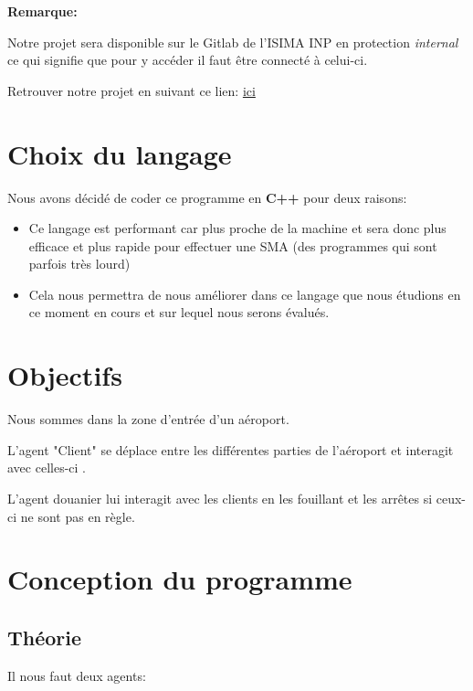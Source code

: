 \documentclass[12pt,french]{article} %
\begin{document}
 \bigskip
 
 \textbf{Remarque:}
 

Notre projet sera disponible sur le Gitlab de l'ISIMA INP en protection \textit{internal} ce qui signifie que pour y accéder il faut être connecté à celui-ci.

Retrouver notre projet en suivant ce lien: \href{https://gitlab.isima.fr/liballejos/smairport}{ici}


\section{Choix du langage}

Nous avons décidé de coder ce programme en \textbf{C++} pour deux raisons:

\medskip

\begin{itemize}
	\item Ce langage est performant car plus proche de la machine et sera donc plus efficace et plus rapide pour effectuer une SMA (des programmes qui sont parfois très lourd)
	
	\item Cela nous permettra de nous améliorer dans ce langage que nous étudions en ce moment en cours et sur lequel nous serons évalués.
\end{itemize}

\newpage


\section{Objectifs}

Nous sommes dans la zone d'entrée d'un aéroport.

L'agent "Client" se déplace entre les différentes parties de l'aéroport et interagit avec celles-ci .

L'agent douanier lui interagit avec les clients en les fouillant et les arrêtes si ceux-ci ne sont pas en règle.

\section{Conception du programme}

\subsection{Théorie}

Il nous faut deux agents:
\end{document}
